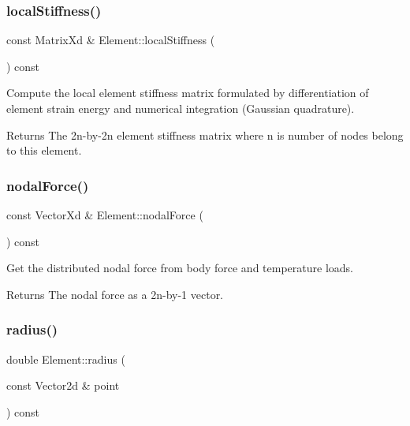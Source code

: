 \subsubsection{\texorpdfstring{local\+Stiffness()}{localStiffness()}}
{\footnotesize\ttfamily const Matrix\+Xd \& Element\+::local\+Stiffness (\begin{DoxyParamCaption}{ }\end{DoxyParamCaption}) const}



Compute the local element stiffness matrix formulated by differentiation of element strain energy and numerical integration (Gaussian quadrature). 

\begin{DoxyReturn}{Returns}
The 2n-\/by-\/2n element stiffness matrix where n is number of nodes belong to this element. 
\end{DoxyReturn}
\mbox{\label{class_element_ac9d07ee9676f15296a097ab97fd5ef7e}} 
\subsubsection{\texorpdfstring{nodal\+Force()}{nodalForce()}}
{\footnotesize\ttfamily const Vector\+Xd \& Element\+::nodal\+Force (\begin{DoxyParamCaption}{ }\end{DoxyParamCaption}) const}



Get the distributed nodal force from body force and temperature loads. 

\begin{DoxyReturn}{Returns}
The nodal force as a 2n-\/by-\/1 vector. 
\end{DoxyReturn}
\mbox{\label{class_element_abab2c4f446d46785abcdfd17777e80d4}} 
\subsubsection{\texorpdfstring{radius()}{radius()}}
{\footnotesize\ttfamily double Element\+::radius (\begin{DoxyParamCaption}\item[{const Vector2d \&}]{point }\end{DoxyParamCaption}) const}



